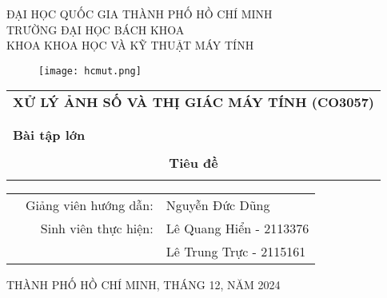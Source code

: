 \documentclass[a4paper]{article}
\begin{document}
	
	\begin{titlepage}
		\begin{center}
			ĐẠI HỌC QUỐC GIA THÀNH PHỐ HỒ CHÍ MINH \\
			TRƯỜNG ĐẠI HỌC BÁCH KHOA \\
			KHOA KHOA HỌC VÀ KỸ THUẬT MÁY TÍNH
		\end{center}
		
		\vspace{1cm}
		
		\begin{figure}[h!]
			\begin{center}
				\texttt{[image: hcmut.png]}
			\end{center}
		\end{figure}
		
		\vspace{1cm}
		
		
		\begin{center}
			\begin{tabular}{c}
				
				\multicolumn{1}{l}{\textbf{{\Large XỬ LÝ ẢNH SỐ VÀ THỊ GIÁC MÁY TÍNH (CO3057)}}}\\
				\\
				\hline
				\\
				\multicolumn{1}{l}{\textbf{{\Large Bài tập lớn}}}\\
				\\
				\textbf{{\Huge Tiêu đề}}\\
				\\
				\hline
			\end{tabular}
		\end{center}
		
		\vspace{3cm}
		
		\begin{table}[h]
			\begin{tabular}{rrl}
				\hspace{5 cm} & Giảng viên hướng dẫn: & Nguyễn Đức Dũng\\
				& Sinh viên thực hiện: & Lê Quang Hiển - 2113376 \\
				& & Lê Trung Trực - 2115161 \\
			\end{tabular}
		\end{table}
		
		\begin{center}
			{\footnotesize THÀNH PHỐ HỒ CHÍ MINH, THÁNG 12, NĂM 2024}
		\end{center}
	\end{titlepage}
	
\end{document}
